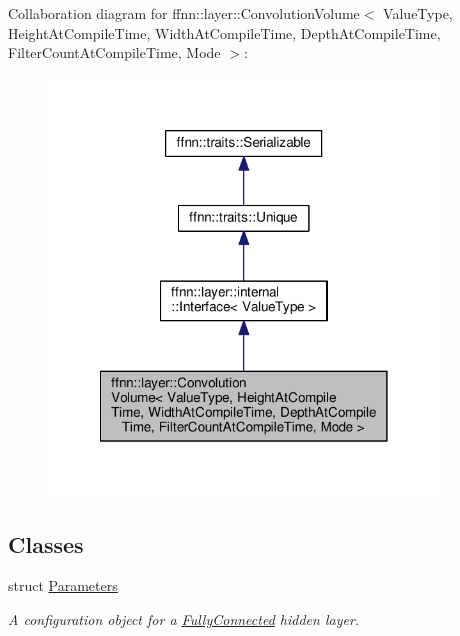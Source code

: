 Collaboration diagram for ffnn\-:\-:layer\-:\-:Convolution\-Volume$<$ Value\-Type, Height\-At\-Compile\-Time, Width\-At\-Compile\-Time, Depth\-At\-Compile\-Time, Filter\-Count\-At\-Compile\-Time, Mode $>$\-:
\nopagebreak
\begin{figure}[H]
\begin{center}
\leavevmode
\includegraphics[width=294pt]{classffnn_1_1layer_1_1_convolution_volume__coll__graph}
\end{center}
\end{figure}
\subsection*{Classes}
\begin{DoxyCompactItemize}
\item 
struct \hyperlink{structffnn_1_1layer_1_1_convolution_volume_1_1_parameters}{Parameters}
\begin{DoxyCompactList}\small\item\em A configuration object for a \hyperlink{classffnn_1_1layer_1_1_fully_connected}{Fully\-Connected} hidden layer. \end{DoxyCompactList}\end{DoxyCompactItemize}
